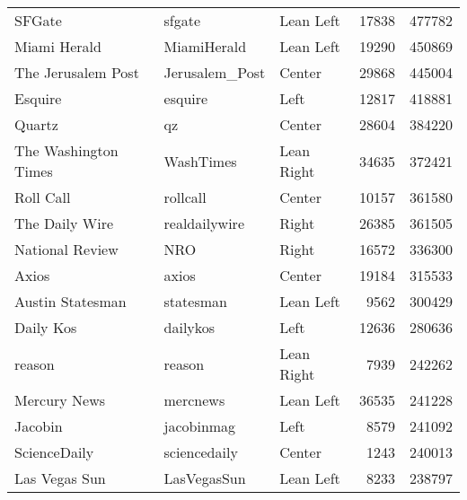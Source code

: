 \begin{center}
\begin{longtable}{lllrr}
                                   SFGate &           sfgate &     Lean Left &             17838 &     477782 \\
                             Miami Herald &      MiamiHerald &     Lean Left &             19290 &     450869 \\
                       The Jerusalem Post &   Jerusalem\_Post &        Center &             29868 &     445004 \\
                                  Esquire &          esquire &          Left &             12817 &     418881 \\
                                   Quartz &               qz &        Center &             28604 &     384220 \\
                     The Washington Times &        WashTimes &    Lean Right &             34635 &     372421 \\
                                Roll Call &         rollcall &        Center &             10157 &     361580 \\
                           The Daily Wire &    realdailywire &         Right &             26385 &     361505 \\
                          National Review &              NRO &         Right &             16572 &     336300 \\
                                    Axios &            axios &        Center &             19184 &     315533 \\
                         Austin Statesman &        statesman &     Lean Left &              9562 &     300429 \\
                                Daily Kos &         dailykos &          Left &             12636 &     280636 \\
                                   reason &           reason &    Lean Right &              7939 &     242262 \\
                             Mercury News &         mercnews &     Lean Left &             36535 &     241228 \\
                                  Jacobin &       jacobinmag &          Left &              8579 &     241092 \\
                             ScienceDaily &     sciencedaily &        Center &              1243 &     240013 \\
                            Las Vegas Sun &      LasVegasSun &     Lean Left &              8233 &     238797 \\

\end{longtable}
\end{center}
